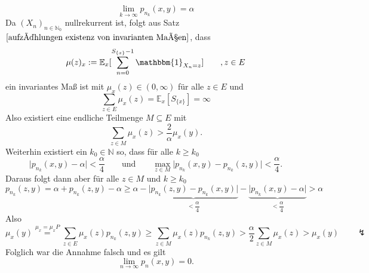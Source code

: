 \begin{equation*}
\lim_{k \to \infty} p_{n_{k}}(x,y) = \alpha
\end{equation*}
Da $(X_{n})_{n \in \mathbb{N}_{0}}$ nullrekurrent ist, folgt aus Satz $\ref{aufzählungen existenz von invarianten Maßen}$, dass 
\begin{equation*}
\mu(z)_{x} := \mathbb{E}_{x}[\sum_{n=0}^{S_{\lbrace x \rbrace}-1} \mathbbm{1}_{X_{n}=z}] \qquad , z \in E
\end{equation*}
ein invariantes Maß ist mit $\mu_{x}(z) \in (0,\infty)$ für alle $z \in E$ und
\begin{equation*}
\sum_{z \in E} \mu_{x}(z) = \mathbb{E}_{x}[S_{\lbrace x \rbrace}] = \infty
\end{equation*}
Also existiert eine endliche Teilmenge $M \subseteq E$ mit 
\begin{equation*}
\sum_{z \in M} \mu_{x}(z) > \dfrac{2}{\alpha} \mu_{x}(y).
\end{equation*}
Weiterhin existiert ein $k_{0} \in \mathbb{N}$ so, dass für alle $k \geq k_{0}$
\begin{equation*}
\vert p_{n_{k}}(x,y) - \alpha \vert < \dfrac{\alpha}{4} \qquad \mathrm{und} \qquad \max_{z \in M} \vert p_{n_{k}}(x,y) - p_{n_{k}}(z,y)  \vert < \dfrac{\alpha}{4}.
\end{equation*}
Daraus folgt dann aber für alle $z \in M$ und $k \geq k_{0}$
\begin{equation*}
p_{n_{k}}(z,y) = \alpha + p_{n_{k}}(z,y) - \alpha \geq \alpha - \underbrace{\vert p_{n_{k}}(z,y) - p_{n_{k}}(x,y) \vert}_{< \dfrac{\alpha}{4}} - \underbrace{\vert p_{n_{k}}(x,y) - \alpha \vert}_{<\dfrac{\alpha}{4}} > \alpha
\end{equation*}
Also
\begin{equation*}
\mu_{x}(y) \stackrel{\mu_{x} = \mu_{x}P}{=} \sum_{z \in E} \mu_{x}(z) p_{n_{k}}(z,y) \geq \sum_{z \in M} \mu_{x}(z) p_{n_{k}}(z,y) > \dfrac{\alpha}{2} \sum_{z \in M} \mu_{x}(z) > \mu_{x}(y) \qquad \lightning
\end{equation*}
Folglich war die Annahme falsch und es gilt
\begin{equation*}
\lim_{n \to \infty} p_{n}(x,y) = 0.
\end{equation*}